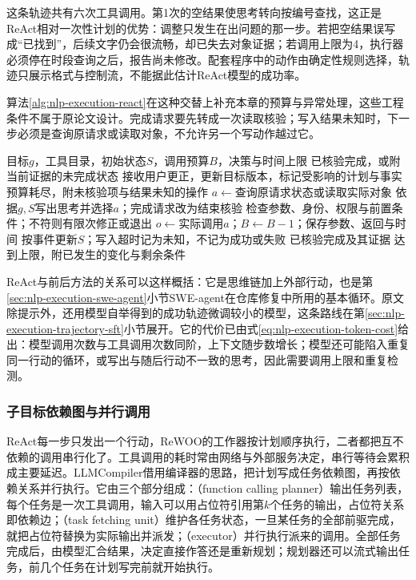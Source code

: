 这条轨迹共有六次工具调用。第1次的空结果使思考转向按编号查找，这正是ReAct相对一次性计划的优势：调整只发生在出问题的那一步。若把空结果误写成“已找到”，后续文字仍会很流畅，却已失去对象证据；若调用上限为4，执行器必须停在时段查询之后，报告尚未修改。配套程序中的动作由确定性规则选择，轨迹只展示格式与控制流，不能据此估计ReAct模型的成功率。

算法\ref{alg:nlp-execution-react}在这种交替上补充本章的预算与异常处理，这些工程条件不属于原论文设计。完成请求要先转成一次读取核验；写入结果未知时，下一步必须是查询原请求或读取对象，不允许另一个写动作越过它。

\begin{algorithm}[带预算与结果核验的行动循环]
\label{alg:nlp-execution-react}
\begin{algorithmic}[1]
\Require 目标$g$，工具目录，初始状态$S$，调用预算$B$，决策与时间上限
\Ensure 已核验完成，或附当前证据的未完成状态
  \State 接收用户更正，更新目标版本，标记受影响的计划与事实
    \State \Return 预算耗尽，附未核验项与结果未知的操作
  \EndIf
    \State $a\gets$查询原请求状态或读取实际对象
  \Else
    \State 依据$g,S$写出思考并选择$a$；完成请求改为结束核验
  \EndIf
  \State 检查参数、身份、权限与前置条件；不符则有限次修正或退出
  \State $o\gets$实际调用$a$；$B\gets B-1$；保存参数、返回与时间
  \State 按事件更新$S$；写入超时记为未知，不记为成功或失败
    \State \Return 已核验完成及其证据
  \EndIf
\EndWhile
\State \Return 达到上限，附已发生的变化与剩余条件
\end{algorithmic}
\end{algorithm}

ReAct与前后方法的关系可以这样概括：它是思维链加上外部行动，也是第\ref{sec:nlp-execution-swe-agent}小节SWE-agent在仓库修复中所用的基本循环。原文除提示外，还用模型自举得到的成功轨迹微调较小的模型，这条路线在第\ref{sec:nlp-execution-trajectory-sft}小节展开。它的代价已由式\eqref{eq:nlp-execution-token-cost}给出：模型调用次数与工具调用次数同阶，上下文随步数增长；模型还可能陷入重复同一行动的循环，或写出与随后行动不一致的思考，因此需要调用上限和重复检测。

\subsubsection{子目标依赖图与并行调用}
\label{sec:nlp-execution-subgoals}

ReAct每一步只发出一个行动，ReWOO的工作器按计划顺序执行，二者都把互不依赖的调用串行化了。工具调用的耗时常由网络与外部服务决定，串行等待会累积成主要延迟。LLMCompiler借用编译器的思路，把计划写成任务依赖图，再按依赖关系并行执行。它由三个部分组成：（function calling planner）输出任务列表，每个任务是一次工具调用，输入可以用占位符引用第$k$个任务的输出，占位符关系即依赖边；（task fetching unit）维护各任务状态，一旦某任务的全部前驱完成，就把占位符替换为实际输出并派发；（executor）并行执行派来的调用。全部任务完成后，由模型汇合结果，决定直接作答还是重新规划；规划器还可以流式输出任务，前几个任务在计划写完前就开始执行。


